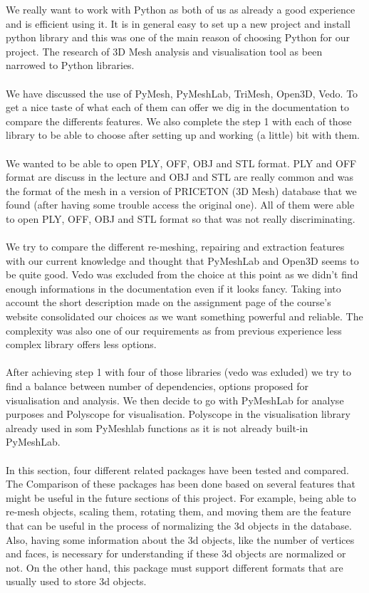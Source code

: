 \documentclass[10pt,twocolumn,letterpaper]{article}
\begin{document}
We really want to work with Python as both of us as already a good experience and is efficient using it. It is in general easy to set up a new project and install python library and this was one of the main reason of choosing Python for our project. The research of 3D Mesh analysis and visualisation tool as been narrowed to Python libraries. \\ \\
We have discussed the use of PyMesh, PyMeshLab, TriMesh, Open3D, Vedo. To get a nice taste of what each of them can offer we dig in the documentation to compare the differents features. We also complete the step 1 with each of those library to be able to choose after setting up and working (a little) bit with them. \\ \\
	We wanted to be able to open PLY, OFF, OBJ and STL format. PLY and OFF format are discuss in the lecture and OBJ and STL are really common and was the format of the mesh in a version of PRICETON (3D Mesh) database that we found (after having some trouble access the original one). All of them were able to open PLY, OFF, OBJ and STL format so that was not really discriminating. \\ \\
	We try to compare the different re-meshing, repairing and extraction features with our current knowledge and thought that PyMeshLab and Open3D seems to be quite good. Vedo was excluded from the choice at this point as we didn't find enough informations in the documentation even if it looks fancy. Taking into account the short description made on the assignment page of the course's website consolidated our choices as we want something powerful and reliable. The complexity was also one of our requirements as from previous experience less complex library offers less options. \\ \\
	After achieving step 1 with four of those libraries (vedo was exluded) we try to find a balance between number of dependencies, options proposed for visualisation and analysis. We then decide to go with PyMeshLab\cite{pymeshlab} for analyse purposes and Polyscope\cite{polyscope} for visualisation. Polyscope in the visualisation library already used in som PyMeshlab functions as it is not already built-in PyMeshLab. \\ \\
In this section, four different related packages have been tested and compared. The Comparison of these packages has been done based on several features that might be useful in the future sections of this project. For example, being able to re-mesh objects, scaling them, rotating them, and moving them are the feature that can be useful in the process of normalizing the 3d objects in the database. Also, having some information about the 3d objects, like the number of vertices and faces, is necessary for understanding if these 3d objects are normalized or not. On the other hand, this package must support different formats that are usually used to store 3d objects.
\end{document}
